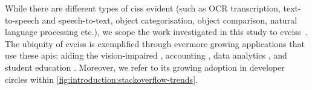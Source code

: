 While there are different types of \glspl{cis} evident (such as OCR transcription, text-to-speech and speech-to-text, object categorisation, object comparison, natural language processing etc.), we scope the work investigated in this study to \glspl{cvcis}~. The ubiquity of \glspl{cvcis} is exemplified through evermore growing applications that use these \glspl{api}: aiding the vision-impaired \citep{Reis:2018cp,daMotaSilveira:2017vp}, accounting  \citep{Marshall:2018uj}, data analytics \citep{Iyengar:2017fb}, and student education \citep{Dibia:2017iy}. Moreover, we refer to its growing adoption in developer circles within \cref{fig:introduction:stackoverflow-trends}.





